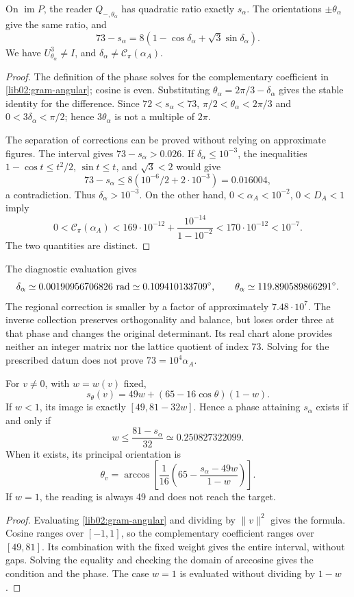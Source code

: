 \begin{corollary}
\label{lib02:fase-alpha}
On \(\operatorname{im}P\), the reader \(Q_{-,\theta_\alpha}\) has quadratic ratio exactly \(s_\alpha\). The orientations \(\pm\theta_\alpha\) give the same ratio, and
\[
 73-s_\alpha
 =8(1-\cos\delta_\alpha+\sqrt3\sin\delta_\alpha).
\]
We have \(U_{\theta_\alpha}^3\ne I\), and \(\delta_\alpha\ne\mathcal C_\pi(\alpha_A)\).
\end{corollary}
\begin{proof}
The definition of the phase solves for the complementary coefficient in \eqref{lib02:gram-angular}; cosine is even. Substituting \(\theta_\alpha=2\pi/3-\delta_\alpha\) gives the stable identity for the difference. Since \(72<s_\alpha<73\), \(\pi/2<\theta_\alpha<2\pi/3\) and \(0<3\delta_\alpha<\pi/2\); hence \(3\theta_\alpha\) is not a multiple of \(2\pi\).

The separation of corrections can be proved without relying on approximate figures. The interval gives \(73-s_\alpha>0.026\). If \(\delta_\alpha\leq10^{-3}\), the inequalities \(1-\cos t\leq t^2/2\), \(\sin t\leq t\), and \(\sqrt3<2\) would give
\[
 73-s_\alpha\leq8(10^{-6}/2+2\cdot10^{-3})=0.016004,
\]
a contradiction. Thus \(\delta_\alpha>10^{-3}\). On the other hand, \(0<\alpha_A<10^{-2}\), \(0<D_A<1\) imply
\[
 0<\mathcal C_\pi(\alpha_A)
 <169\cdot10^{-12}+\frac{10^{-14}}{1-10^{-2}}
 <170\cdot10^{-12}<10^{-7}.
\]
The two quantities are distinct.
\end{proof}

The diagnostic evaluation gives
\[
 \delta_\alpha\simeq0.00190956706826\ {\rm rad}
 \simeq0.109410133709^\circ,\qquad
 \theta_\alpha\simeq119.890589866291^\circ.
\]
The regional correction is smaller by a factor of approximately \(7.48\cdot10^7\). The inverse collection preserves orthogonality and balance, but loses order three at that phase and changes the original determinant. Its real chart alone provides neither an integer matrix nor the lattice quotient of index 73. Solving for the prescribed datum does not prove \(73=10^4\alpha_A\).

\begin{proposition}
\label{lib02:alcanzabilidad}
For \(v\ne0\), with \(w=w(v)\) fixed,
\[
 s_\theta(v)=49w+(65-16\cos\theta)(1-w).
\]
If \(w<1\), its image is exactly \([49,81-32w]\). Hence a phase attaining \(s_\alpha\) exists if and only if
\[
 w\leq\frac{81-s_\alpha}{32}\simeq0.250827322099.
\]
When it exists, its principal orientation is
\[
 \theta_v=\arccos\left[
 \frac1{16}\left(65-\frac{s_\alpha-49w}{1-w}\right)\right].
\]
If \(w=1\), the reading is always 49 and does not reach the target.
\end{proposition}
\begin{proof}
Evaluating \eqref{lib02:gram-angular} and dividing by \(\|v\|^2\) gives the formula. Cosine ranges over \([-1,1]\), so the complementary coefficient ranges over \([49,81]\). Its combination with the fixed weight gives the entire interval, without gaps. Solving the equality and checking the domain of arccosine gives the condition and the phase. The case \(w=1\) is evaluated without dividing by \(1-w\).
\end{proof}

